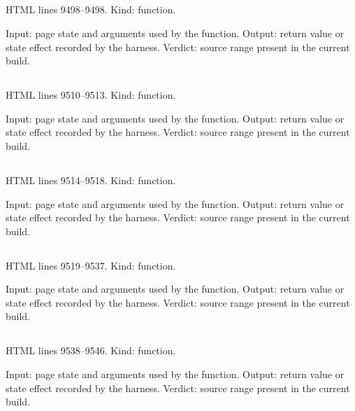 \subsection*{\texttt{}}
\label{vf_521_findingTextKey}
HTML lines 9498--9498. Kind: function.

Input: page state and arguments used by the function.
Output: return value or state effect recorded by the harness.
Verdict: source range present in the current build.

\subsection*{\texttt{}}
\label{vf_522_findingEvidenceKey}
HTML lines 9510--9513. Kind: function.

Input: page state and arguments used by the function.
Output: return value or state effect recorded by the harness.
Verdict: source range present in the current build.

\subsection*{\texttt{}}
\label{vf_523_findingKey}
HTML lines 9514--9518. Kind: function.

Input: page state and arguments used by the function.
Output: return value or state effect recorded by the harness.
Verdict: source range present in the current build.

\subsection*{\texttt{}}
\label{vf_524_reviewDisplayFindings}
HTML lines 9519--9537. Kind: function.

Input: page state and arguments used by the function.
Output: return value or state effect recorded by the harness.
Verdict: source range present in the current build.

\subsection*{\texttt{}}
\label{vf_525_reviewDisplayCounts}
HTML lines 9538--9546. Kind: function.

Input: page state and arguments used by the function.
Output: return value or state effect recorded by the harness.
Verdict: source range present in the current build.

